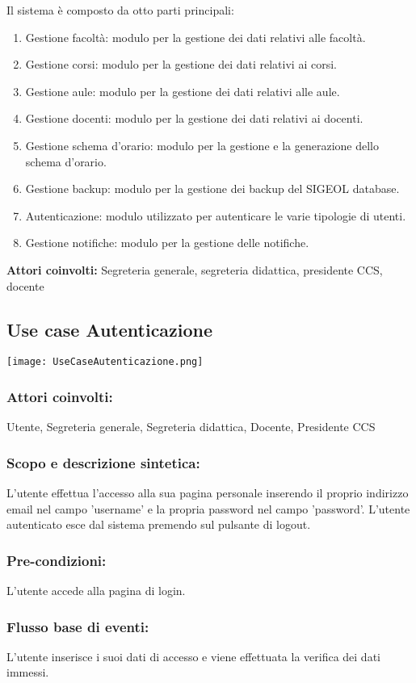 \documentclass[11pt,a4paper]{article}
\begin{document}
Il sistema è composto da otto parti principali:
\begin{enumerate}
\item Gestione facoltà: modulo per la gestione dei dati relativi alle facoltà. 
\item Gestione corsi: modulo per la gestione dei dati relativi ai corsi.
\item Gestione aule: modulo per la gestione dei dati relativi alle aule.
\item Gestione docenti: modulo per la gestione dei dati relativi ai docenti.
\item Gestione schema d'orario: modulo per la gestione e la generazione dello schema d'orario.
\item Gestione backup: modulo per la gestione dei backup del SIGEOL database.
\item Autenticazione: modulo utilizzato per autenticare le varie tipologie di utenti.
\item Gestione notifiche: modulo per la gestione delle notifiche.
\end{enumerate}
\textbf{Attori coinvolti:}
Segreteria generale, segreteria didattica, presidente CCS, docente
\subsection{Use case Autenticazione}
\begin{center} 
 \texttt{[image: UseCaseAutenticazione.png]}
\end{center}
\subsubsection*{Attori coinvolti:}
Utente, Segreteria generale, Segreteria didattica, Docente, Presidente CCS
\subsubsection*{Scopo e descrizione sintetica:}
L'utente effettua l'accesso alla sua pagina personale inserendo il proprio indirizzo email nel campo 'username' e la propria password
nel campo 'password'.
L'utente autenticato esce dal sistema premendo sul pulsante di logout.
\subsubsection*{Pre-condizioni:}
L'utente accede alla pagina di login.
\subsubsection*{Flusso base di eventi:}
L'utente inserisce i suoi dati di accesso e viene effettuata la verifica dei dati immessi.
\end{document}
